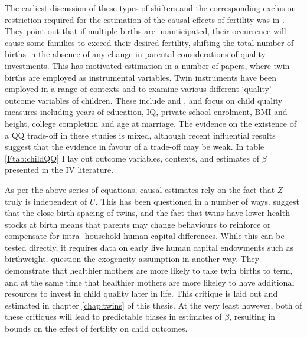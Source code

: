 The earliest discussion of these types of shifters and the corresponding 
exclusion restriction required for the estimation of the causal effects of 
fertility was in \citet{RosenzweigWolpin1980}. They point out that if multiple 
births are unanticipated, their occurrence will cause some families to exceed 
their desired fertility, shifting the total number of births in the absence of 
any change in parental considerations of quality investments. This has motivated 
estimation in a number of papers, where twin births are employed as instrumental 
variables.  Twin instruments have been employed in a range of contexts and
to examine various different `quality' outcome variables of children. These 
include \citet{Blacketal2005,Caceres2006,Lietal2008,Dayiogluetal2009,Sanhueza2009,
Blacketal2010,Angristetal2010,FitzsimonsMalde2010} and \citet{SouzaPonczek2012}, 
and focus on child quality measures including years of education, IQ, private 
school enrolment, BMI and height, college completion and age at marriage.  The 
evidence on the existence of a QQ trade-off in these studies is mixed, 
although recent influential results suggest that the evidence in favour of a 
trade-off may be weak.  In table \ref{Ftab:childQQ} I lay out outcome variables, 
contexts, and estimates of $\beta$ presented in the IV literature.

As per the above series of equations, causal estimates rely on the fact that
$Z$ truly is independent of $U$.  This has been questioned in a number of ways.
\citet{RosenzweigZhang2009} suggest that the close birth-spacing of twins, and 
the fact that twins have lower health stocks at birth \citep{Almondetal2005}
means that parents may change behaviours to reinforce or compensate for intra-%
household human capital differences.  While this can be tested directly, it 
requires data on early live human capital endowments such as birthweight.  
\citet{BhalotraClarke2015} question the exogeneity assumption in another way.
They demonstrate that healthier mothers are more likely to take twin births
to term, and at the same time that healthier mothers are more likeley to have
additional resources to invest in child quality later in life.  This critique is
laid out and estimated in chapter \ref{chap:twins} of this thesis.  At the very
least however, both of these critiques will lead to predictable biases in 
estimates of $\beta$, resulting in bounds on the effect of fertility on child
outcomes.

